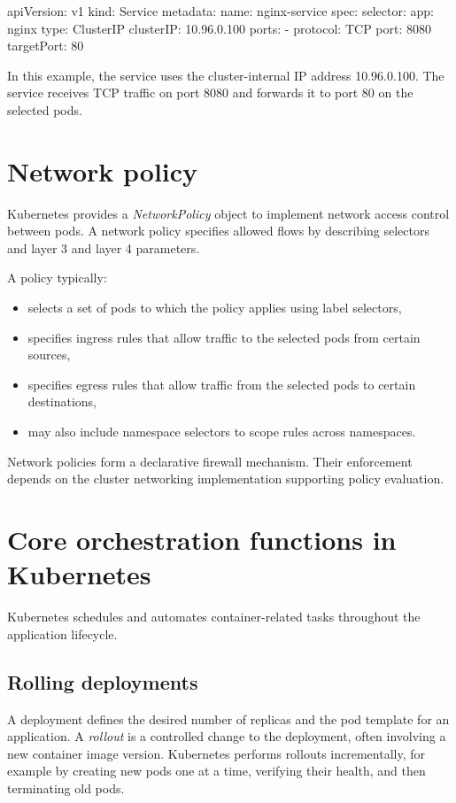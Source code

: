 \documentclass[11pt,a4paper,openany]{report}
\begin{document}
\begin{codeblock}
apiVersion: v1
kind: Service
metadata:
  name: nginx-service
spec:
  selector:
    app: nginx
  type: ClusterIP
  clusterIP: 10.96.0.100
  ports:
    - protocol: TCP
      port: 8080
      targetPort: 80
\end{codeblock}

In this example, the service uses the cluster-internal IP address 10.96.0.100. The service receives TCP traffic on port 8080 and forwards it to port 80 on the selected pods.

\section{Network policy}

Kubernetes provides a \emph{NetworkPolicy} object to implement network access control between pods. A network policy specifies allowed flows by describing selectors and layer 3 and layer 4 parameters.

A policy typically:

\begin{itemize}
\item selects a set of pods to which the policy applies using label selectors,
\item specifies ingress rules that allow traffic to the selected pods from certain sources,
\item specifies egress rules that allow traffic from the selected pods to certain destinations,
\item may also include namespace selectors to scope rules across namespaces.
\end{itemize}

Network policies form a declarative firewall mechanism. Their enforcement depends on the cluster networking implementation supporting policy evaluation.

\section{Core orchestration functions in Kubernetes}

Kubernetes schedules and automates container-related tasks throughout the application lifecycle.

\subsection{Rolling deployments}

A deployment defines the desired number of replicas and the pod template for an application. A \emph{rollout} is a controlled change to the deployment, often involving a new container image version. Kubernetes performs rollouts incrementally, for example by creating new pods one at a time, verifying their health, and then terminating old pods.
\end{document}
